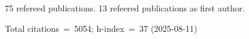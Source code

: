 75 refereed publications. 13 refeered publications as first author.

Total citations~=~5054; h-index~=~37 (2025-08-11)